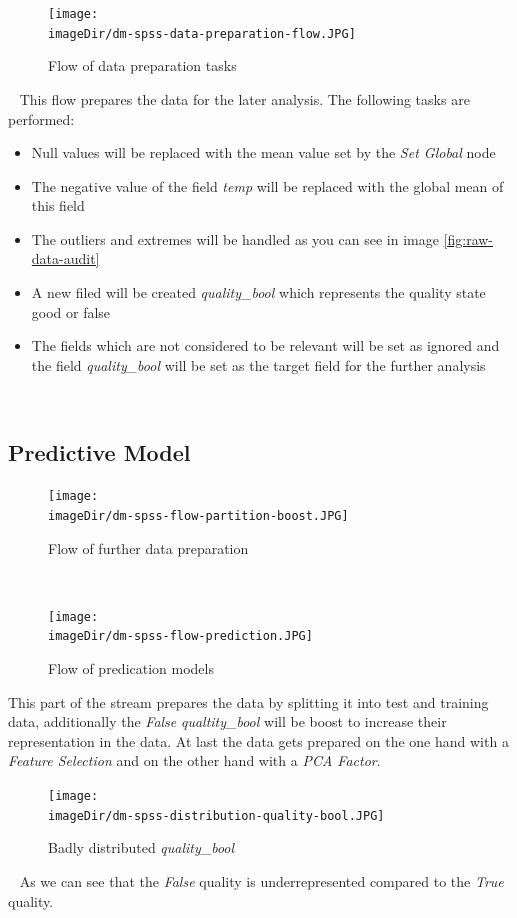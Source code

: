 \documentclass[11pt, a4paper, twoside]{article}   	%
\newcommand{\imageDir}{./images/}
\begin{document}
\begin{figure}[h]
\centering
\texttt{[image: \\imageDir/dm-spss-data-preparation-flow.JPG]}
\caption{Flow of data preparation tasks}
\end{figure}
\ \newline
This flow prepares the data for the later analysis. The following tasks are performed:
\begin{itemize}
	\item Null values will be replaced with the mean value set by the \emph{Set Global} node
	\item The negative value of the field \emph{temp} will be replaced with the global mean of this field
	\item The outliers and extremes will be handled as you can see in image \ref{fig:raw-data-audit}
	\item A new filed will be created \emph{quality\_bool} which represents the quality state good or false
	\item The fields which are not considered to be relevant will be set as ignored and the field \emph{quality\_bool} will be set as the target field for the further analysis
\end{itemize}
\ \newpage

\subsection{Predictive Model}
\begin{figure}[h]
\centering
\texttt{[image: \\imageDir/dm-spss-flow-partition-boost.JPG]}
\caption{Flow of further data preparation}
\end{figure}
\ \newline

\begin{figure}[h]
\centering
\texttt{[image: \\imageDir/dm-spss-flow-prediction.JPG]}
\caption{Flow of predication models}
\end{figure}

This part of the stream prepares the data by splitting it into test and training data, additionally the \emph{False} \emph{qualtity\_bool} will be boost to increase their representation in the data. At last the data gets prepared on the one hand with a \emph{Feature Selection} and on the other hand with a \emph{PCA Factor}.
\ \newpage

\begin{figure}[h]
\centering
\texttt{[image: \\imageDir/dm-spss-distribution-quality-bool.JPG]}
\caption{Badly distributed \emph{quality\_bool}}
\end{figure}
\ \newline
As we can see that the \emph{False} quality is underrepresented compared to the \emph{True} quality.
\end{document}

